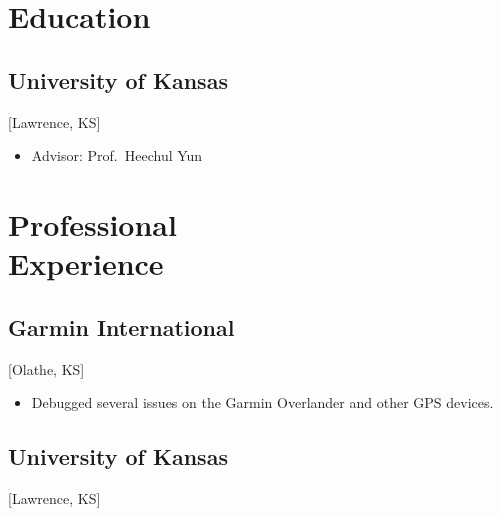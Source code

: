\documentclass{mycv}
\begin{document}
\maketitle%

\section{Education}

\subsection{University of Kansas}[Lawrence, KS]
\begin{positions}
\end{positions}
\vspace{-\parskip}%
\begin{itemize}[label={}]
    \item Advisor: {Prof.~Heechul Yun}
\end{itemize}

\begin{positions}
\end{positions}
\vspace{-\parskip}%

\section{Professional \\ Experience}

\subsection{Garmin International}[Olathe, KS]
\begin{positions}
\end{positions}

\begin{itemize}
    \item Debugged several issues on the Garmin Overlander and other GPS devices.
\end{itemize}

\subsection{University of Kansas}[Lawrence, KS]
\begin{positions}
\end{positions}
\end{document}
